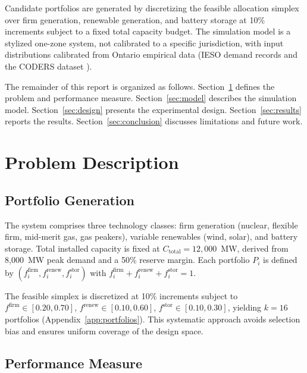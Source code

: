 \documentclass[11pt]{article}
\begin{document}
Candidate portfolios are generated by discretizing the feasible allocation simplex over firm generation, renewable generation, and battery storage at 10\% increments subject to a fixed total capacity budget. The simulation model is a stylized one-zone system, not calibrated to a specific jurisdiction, with input distributions calibrated from Ontario empirical data (IESO demand records and the CODERS dataset \citep{CODERS2025}).

The remainder of this report is organized as follows. Section~\ref{sec:problem} defines the problem and performance measure. Section~\ref{sec:model} describes the simulation model. Section~\ref{sec:design} presents the experimental design. Section~\ref{sec:results} reports the results. Section~\ref{sec:conclusion} discusses limitations and future work.

\section{Problem Description}\label{sec:problem}

\subsection{Portfolio Generation}

The system comprises three technology classes: firm generation (nuclear, flexible firm, mid-merit gas, gas peakers), variable renewables (wind, solar), and battery storage. Total installed capacity is fixed at $C_{\text{total}} = 12{,}000$~MW, derived from 8,000~MW peak demand and a 50\% reserve margin. Each portfolio $P_i$ is defined by $(f_i^{\text{firm}}, f_i^{\text{renew}}, f_i^{\text{stor}})$ with $f_i^{\text{firm}} + f_i^{\text{renew}} + f_i^{\text{stor}} = 1$.

The feasible simplex is discretized at 10\% increments subject to $f^{\text{firm}} \in [0.20, 0.70]$, $f^{\text{renew}} \in [0.10, 0.60]$, $f^{\text{stor}} \in [0.10, 0.30]$, yielding $k = 16$ portfolios (Appendix~\ref{app:portfolios}). This systematic approach avoids selection bias and ensures uniform coverage of the design space.

\subsection{Performance Measure}
\end{document}
